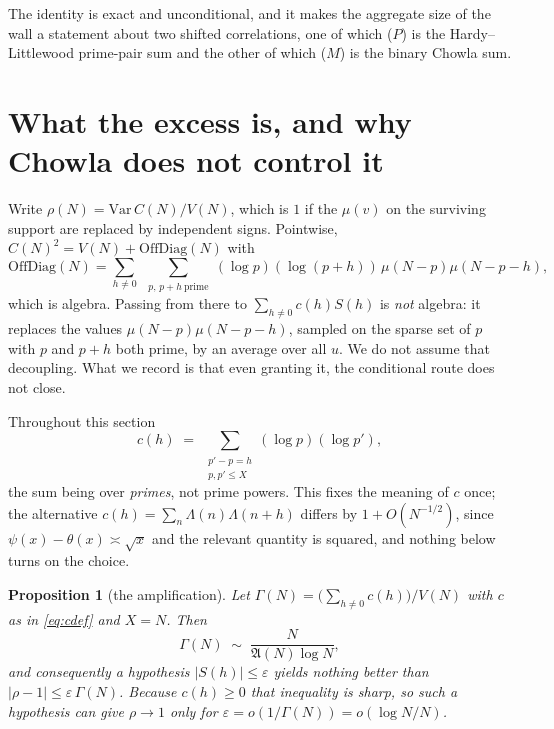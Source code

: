 \documentclass[11pt,a4paper]{article}
\theoremstyle{plain}
\newtheorem{proposition}[theorem]{Proposition}
\theoremstyle{definition}
\theoremstyle{remark}
\newcommand{\AAA}{\mathfrak{A}}
\begin{document}
The identity is exact and unconditional, and it makes the aggregate
size of the wall a statement about two shifted correlations, one of
which ($P$) is the Hardy--Littlewood prime-pair sum and the other of
which ($M$) is the binary Chowla sum.

\section{What the excess is, and why Chowla does not control it}%
\label{sec:chowla}

Write $\rho(N)=\mathrm{Var}\,C(N)/V(N)$, which is $1$ if the $\mu(v)$
on the surviving support are replaced by independent signs. Pointwise,
$C(N)^2=V(N)+\mathrm{OffDiag}(N)$ with
\begin{equation}\label{eq:offdiag}
  \mathrm{OffDiag}(N)
  =\sum_{h\ne0}\ \sum_{\substack{p,\,p+h\ \text{prime}}}
    (\log p)(\log(p+h))\,\mu(N-p)\mu(N-p-h),
\end{equation}
which is algebra. Passing from there to $\sum_{h\ne0}c(h)S(h)$ is
\emph{not} algebra: it replaces the values $\mu(N-p)\mu(N-p-h)$,
sampled on the sparse set of $p$ with $p$ and $p+h$ both prime, by an
average over all $u$. We do not assume that decoupling. What we record
is that even granting it, the conditional route does not close.

Throughout this section
\begin{equation}\label{eq:cdef}
  c(h)\;=\;\sum_{\substack{p'-p=h\\ p,p'\le X}}(\log p)(\log p'),
\end{equation}
the sum being over \emph{primes}, not prime powers. This fixes the
meaning of $c$ once; the alternative
$c(h)=\sum_n\Lambda(n)\Lambda(n+h)$ differs by $1+O(N^{-1/2})$, since
$\psi(x)-\theta(x)\asymp\sqrt x$ and the relevant quantity is squared,
and nothing below turns on the choice.

\begin{proposition}[the amplification]\label{prop:W}
Let $\Gamma(N)=\bigl(\sum_{h\ne0}c(h)\bigr)/V(N)$ with $c$ as in
\eqref{eq:cdef} and $X=N$. Then
\[
  \Gamma(N)\;\sim\;\frac{N}{\AAA(N)\log N},
\]
and consequently a hypothesis $|S(h)|\le\varepsilon$ yields nothing
better than $|\rho-1|\le\varepsilon\,\Gamma(N)$. Because $c(h)\ge0$
that inequality is sharp, so such a hypothesis can give $\rho\to1$
only for $\varepsilon=o(1/\Gamma(N))=o(\log N/N)$.
\end{proposition}
\end{document}
